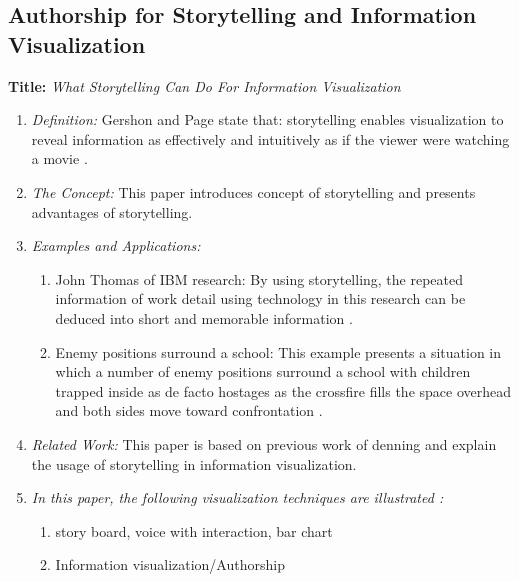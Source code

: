 \documentclass{egpubl}
\begin{document}
\subsection{Authorship for Storytelling and Information Visualization}
\textbf{Title:} \textit{What Storytelling Can Do For Information Visualization}
\begin{enumerate}
\item \textit{Definition:} Gershon and Page state that: storytelling enables visualization to reveal information as effectively and intuitively as if the viewer were watching a movie \cite{Gershon2}. 
\item \textit{The Concept:} This paper introduces concept of storytelling and presents advantages of storytelling.
\item  \textit{Examples and Applications:} 
\begin{enumerate}
\item John Thomas of IBM research: By using storytelling, the repeated information of work detail using technology in this research can be deduced into short and memorable information \cite{Thomas}.
\item Enemy positions surround a school: This example presents a situation in which a number of enemy positions surround a school with children trapped inside as de facto hostages as the crossfire fills the space overhead and both sides move toward confrontation \cite{denning}.
\end{enumerate}
\item \textit{Related Work:} This paper is based on previous work of denning \cite{denning} and explain the usage of storytelling in information visualization.
\item \textit{In this paper, the following visualization techniques are illustrated :} 
\begin{enumerate}
\item story board, voice with interaction, bar chart
\item Information visualization/Authorship
\end{enumerate}
\end{enumerate}
\end{document}
